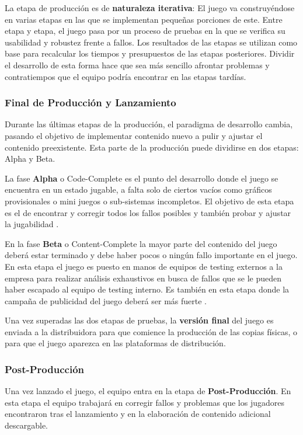 La etapa de producción es de \textbf{naturaleza iterativa}: El juego va construyéndose en varias etapas en las que se implementan pequeñas porciones de este. Entre etapa y etapa, el juego pasa por un proceso de pruebas en la que se verifica su usabilidad y robustez frente a fallos. Los resultados de las etapas se utilizan como base para recalcular los tiempos y presupuestos de las etapas posteriores. Dividir el desarrollo de esta forma hace que sea más sencillo afrontar problemas y contratiempos que el equipo podría encontrar en las etapas tardías.

\subsubsection{Final de Producción y Lanzamiento}
Durante las últimas etapas de la producción, el paradigma de desarrollo cambia, pasando el objetivo de implementar contenido nuevo a pulir y ajustar el contenido preexistente. Esta parte de la producción puede dividirse en dos etapas: Alpha y Beta.

La fase \textbf{Alpha} o Code-Complete es el punto del desarrollo donde el juego se encuentra en un estado jugable, a falta solo de ciertos vacíos como gráficos provisionales o mini juegos o sub-sistemas incompletos. El objetivo de esta etapa es el de encontrar y corregir todos los fallos posibles y también probar y ajustar la jugabilidad \cite{development_and_production}.

En la fase \textbf{Beta} o Content-Complete la mayor parte del contenido del juego deberá estar terminado y debe haber pocos o ningún fallo importante en el juego. En esta etapa el juego es puesto en manos de equipos de testing externos a la empresa para realizar análisis exhaustivos en busca de fallos que se le pueden haber escapado al equipo de testing interno. Es también en esta etapa donde la campaña de publicidad del juego deberá ser más fuerte \cite{development_and_production}.

Una vez superadas las dos etapas de pruebas, la \textbf{versión final} del juego es enviada a la distribuidora para que comience la producción de las copias físicas, o para que el juego aparezca en las plataformas de distribución.

\subsubsection{Post-Producción}
Una vez lanzado el juego, el equipo entra en la etapa de \textbf{Post-Producción}. En esta etapa el equipo trabajará en corregir fallos y problemas que los jugadores encontraron tras el lanzamiento y en la elaboración de contenido adicional descargable.


